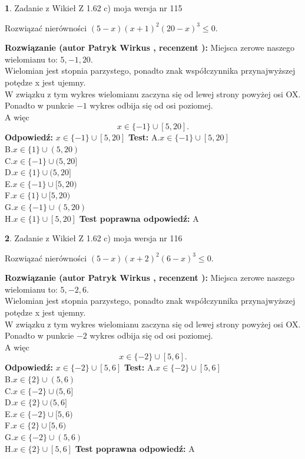 \documentclass[12pt, a4paper]{article}
\theoremstyle{definition} %
\newtheorem{zad}{}
\newcommand{\zadStart}[1]{\begin{zad}#1\newline}
\newcommand{\zadStop}{\end{zad}}
\newcommand{\rozwStart}[2]{\noindent \textbf{Rozwiązanie (autor #1 , recenzent #2): }\newline}
\newcommand{\rozwStop}{\newline}
\newcommand{\odpStart}{\noindent \textbf{Odpowiedź:}\newline}
\newcommand{\odpStop}{\newline}
\newcommand{\testStart}{\noindent \textbf{Test:}\newline}
\newcommand{\testStop}{\newline}
\newcommand{\kluczStart}{\noindent \textbf{Test poprawna odpowiedź:}\newline}
\newcommand{\kluczStop}{\newline}
\begin{document}
\zadStart{Zadanie z Wikieł Z 1.62 c) moja wersja nr 115}

Rozwiązać nierówności $(5-x)(x+1)^{2}(20-x)^{3}\le0$.
\zadStop
\rozwStart{Patryk Wirkus}{}
Miejsca zerowe naszego wielomianu to: $5, -1, 20$.\\
Wielomian jest stopnia parzystego, ponadto znak współczynnika przy\linebreak najwyższej potędze x jest ujemny.\\ W związku z tym wykres wielomianu zaczyna się od lewej strony powyżej osi OX.\\
Ponadto w punkcie $-1$ wykres odbija się od osi poziomej.\\
A więc $$x \in \{-1\} \cup [5,20].$$
\rozwStop
\odpStart
$x \in \{-1\} \cup [5,20]$
\odpStop
\testStart
A.$x \in \{-1\} \cup [5,20]$\\
B.$x \in \{1\} \cup (5,20)$\\
C.$x \in \{-1\} \cup (5,20]$\\
D.$x \in \{1\} \cup (5,20]$\\
E.$x \in \{-1\} \cup [5,20)$\\
F.$x \in \{1\} \cup [5,20)$\\
G.$x \in \{-1\} \cup (5,20)$\\
H.$x \in \{1\} \cup [5,20]$
\testStop
\kluczStart
A
\kluczStop



\zadStart{Zadanie z Wikieł Z 1.62 c) moja wersja nr 116}

Rozwiązać nierówności $(5-x)(x+2)^{2}(6-x)^{3}\le0$.
\zadStop
\rozwStart{Patryk Wirkus}{}
Miejsca zerowe naszego wielomianu to: $5, -2, 6$.\\
Wielomian jest stopnia parzystego, ponadto znak współczynnika przy\linebreak najwyższej potędze x jest ujemny.\\ W związku z tym wykres wielomianu zaczyna się od lewej strony powyżej osi OX.\\
Ponadto w punkcie $-2$ wykres odbija się od osi poziomej.\\
A więc $$x \in \{-2\} \cup [5,6].$$
\rozwStop
\odpStart
$x \in \{-2\} \cup [5,6]$
\odpStop
\testStart
A.$x \in \{-2\} \cup [5,6]$\\
B.$x \in \{2\} \cup (5,6)$\\
C.$x \in \{-2\} \cup (5,6]$\\
D.$x \in \{2\} \cup (5,6]$\\
E.$x \in \{-2\} \cup [5,6)$\\
F.$x \in \{2\} \cup [5,6)$\\
G.$x \in \{-2\} \cup (5,6)$\\
H.$x \in \{2\} \cup [5,6]$
\testStop
\kluczStart
A
\kluczStop
\end{document}
